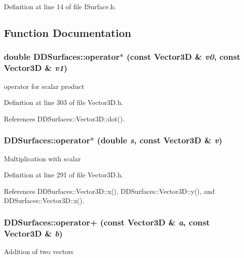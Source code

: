 Definition at line 14 of file ISurface.h.

\subsection{Function Documentation}
\hypertarget{namespace_d_d_surfaces_ac26468a9e0a55f857dd466023fd49e53}{
\subsubsection[{operator$\ast$}]{\setlength{\rightskip}{0pt plus 5cm}double DDSurfaces::operator$\ast$ (const Vector3D \& {\em v0}, \/  const Vector3D \& {\em v1})}}
\label{namespace_d_d_surfaces_ac26468a9e0a55f857dd466023fd49e53}


operator for scalar product 

Definition at line 303 of file Vector3D.h.

References DDSurfaces::Vector3D::dot().\hypertarget{namespace_d_d_surfaces_a6bbc0c2ca88c4b8e2fdcaf98199f4cd8}{
\subsubsection[{operator$\ast$}]{ DDSurfaces::operator$\ast$ (double {\em s}, \/  const Vector3D \& {\em v})}}
\label{namespace_d_d_surfaces_a6bbc0c2ca88c4b8e2fdcaf98199f4cd8}
Multiplication with scalar 

Definition at line 291 of file Vector3D.h.

References DDSurfaces::Vector3D::x(), DDSurfaces::Vector3D::y(), and DDSurfaces::Vector3D::z().\hypertarget{namespace_d_d_surfaces_a53190f14a4492924eba5f73fe10b7c2e}{
\subsubsection[{operator+}]{ DDSurfaces::operator+ (const Vector3D \& {\em a}, \/  const Vector3D \& {\em b})}}
\label{namespace_d_d_surfaces_a53190f14a4492924eba5f73fe10b7c2e}
Addition of two vectors 

